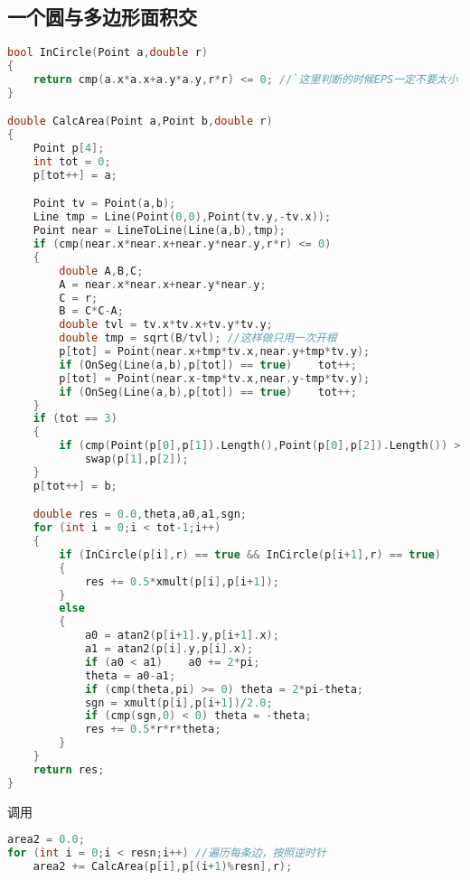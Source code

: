 \subsection{一个圆与多边形面积交}
    \begin{lstlisting}[language=c++]
bool InCircle(Point a,double r)
{
    return cmp(a.x*a.x+a.y*a.y,r*r) <= 0; //`这里判断的时候EPS一定不要太小！！`
}

double CalcArea(Point a,Point b,double r)
{
    Point p[4];
    int tot = 0;
    p[tot++] = a;

    Point tv = Point(a,b);
    Line tmp = Line(Point(0,0),Point(tv.y,-tv.x));
    Point near = LineToLine(Line(a,b),tmp);
    if (cmp(near.x*near.x+near.y*near.y,r*r) <= 0)
    {
        double A,B,C;
        A = near.x*near.x+near.y*near.y;
        C = r;
        B = C*C-A;
        double tvl = tv.x*tv.x+tv.y*tv.y;
        double tmp = sqrt(B/tvl); //这样做只用一次开根
        p[tot] = Point(near.x+tmp*tv.x,near.y+tmp*tv.y);
        if (OnSeg(Line(a,b),p[tot]) == true)    tot++;
        p[tot] = Point(near.x-tmp*tv.x,near.y-tmp*tv.y);
        if (OnSeg(Line(a,b),p[tot]) == true)    tot++;
    }
    if (tot == 3)
    {
        if (cmp(Point(p[0],p[1]).Length(),Point(p[0],p[2]).Length()) > 0)
            swap(p[1],p[2]);
    }
    p[tot++] = b;

    double res = 0.0,theta,a0,a1,sgn;
    for (int i = 0;i < tot-1;i++)
    {
        if (InCircle(p[i],r) == true && InCircle(p[i+1],r) == true)
        {
            res += 0.5*xmult(p[i],p[i+1]);
        }
        else
        {
            a0 = atan2(p[i+1].y,p[i+1].x);
            a1 = atan2(p[i].y,p[i].x);
            if (a0 < a1)    a0 += 2*pi;
            theta = a0-a1;
            if (cmp(theta,pi) >= 0) theta = 2*pi-theta;
            sgn = xmult(p[i],p[i+1])/2.0;
            if (cmp(sgn,0) < 0) theta = -theta;
            res += 0.5*r*r*theta;
        }
    }
    return res;
}
    \end{lstlisting}
    调用
    \begin{lstlisting}[language=c++]
area2 = 0.0;
for (int i = 0;i < resn;i++) //遍历每条边，按照逆时针
    area2 += CalcArea(p[i],p[(i+1)%resn],r);
    \end{lstlisting}